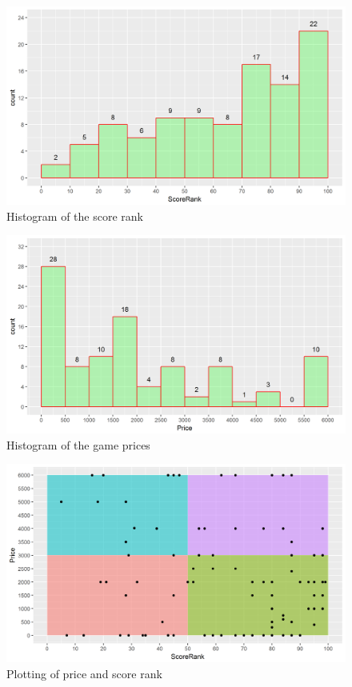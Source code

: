 \documentclass[figures_tabs.tex]{subfiles}
\begin{document}
\begin{figure}[H]
    \centering
    \includegraphics[width=\textwidth]{img/score_rank.png}
    \caption{Histogram of the score rank}
    \label{fig:score_rank}
\end{figure}

\begin{figure}[H]
    \centering
    \includegraphics[width=\textwidth]{img/price.png}
    \caption{Histogram of the game prices}
    \label{fig:price}
\end{figure}

\begin{figure}[H]
    \centering
    \includegraphics[width=\textwidth]{img/score_price.png}
    \caption{Plotting of price and score rank}
    \label{fig:score_price}
\end{figure}
\end{document}

